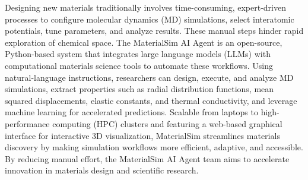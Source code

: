 Designing new materials traditionally involves time-consuming, expert-driven processes to configure molecular dynamics (MD) simulations, select interatomic potentials, tune parameters, and analyze results. These manual steps hinder rapid exploration of chemical space. The MaterialSim AI Agent is an open-source, Python-based system that integrates large language models (LLMs) with computational materials science tools to automate these workflows. Using natural-language instructions, researchers can design, execute, and analyze MD simulations, extract properties such as radial distribution functions, mean squared displacements, elastic constants, and thermal conductivity, and leverage machine learning for accelerated predictions. Scalable from laptops to high-performance computing (HPC) clusters and featuring a web-based graphical interface for interactive 3D visualization, MaterialSim streamlines materials discovery by making simulation workflows more efficient, adaptive, and accessible. By reducing manual effort, the MaterialSim AI Agent team aims to accelerate innovation in materials design and scientific research.


